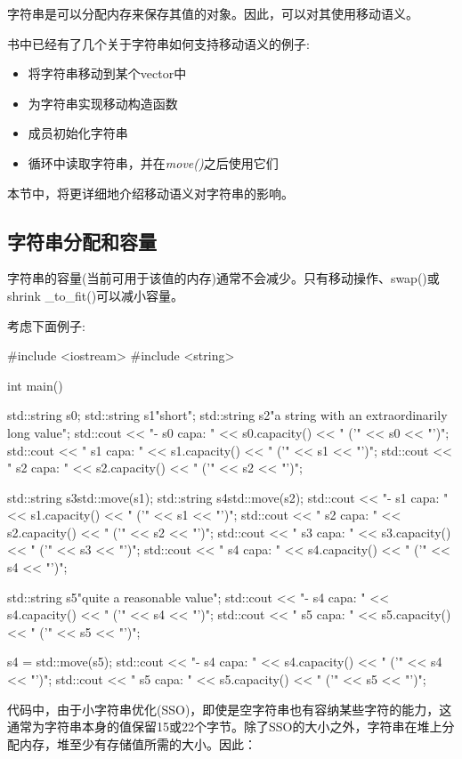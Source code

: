字符串是可以分配内存来保存其值的对象。因此，可以对其使用移动语义。

书中已经有了几个关于字符串如何支持移动语义的例子:

\begin{itemize}
	\item 将字符串移动到某个vector中
	\item 为字符串实现移动构造函数
	\item 成员初始化字符串
	\item 循环中读取字符串，并在\textit{move()}之后使用它们
\end{itemize}

本节中，将更详细地介绍移动语义对字符串的影响。

\subsection{字符串分配和容量}

字符串的容量(当前可用于该值的内存)通常不会减少。只有移动操作、swap()或shrink _to_fit()可以减小容量。

考虑下面例子:

\begin{cppcode}
#include <iostream>
#include <string>

int main()
{
	std::string s0;
	std::string s1{"short"};
	std::string s2{"a string with an extraordinarily long value"};
	std::cout << "- s0 capa: " << s0.capacity() << " ('" << s0 << "')\n";
	std::cout << " s1 capa: " << s1.capacity() << " ('" << s1 << "')\n";
	std::cout << " s2 capa: " << s2.capacity() << " ('" << s2 << "')\n";
	
	std::string s3{std::move(s1)};
	std::string s4{std::move(s2)};
	std::cout << "- s1 capa: " << s1.capacity() << " ('" << s1 << "')\n";
	std::cout << " s2 capa: " << s2.capacity() << " ('" << s2 << "')\n";
	std::cout << " s3 capa: " << s3.capacity() << " ('" << s3 << "')\n";
	std::cout << " s4 capa: " << s4.capacity() << " ('" << s4 << "')\n";
	
	std::string s5{"quite a reasonable value"};
	std::cout << "- s4 capa: " << s4.capacity() << " ('" << s4 << "')\n";
	std::cout << " s5 capa: " << s5.capacity() << " ('" << s5 << "')\n";
	
	s4 = std::move(s5);
	std::cout << "- s4 capa: " << s4.capacity() << " ('" << s4 << "')\n";
	std::cout << " s5 capa: " << s5.capacity() << " ('" << s5 << "')\n";
}
\end{cppcode}

代码中，由于小字符串优化(SSO)，即使是空字符串也有容纳某些字符的能力，这通常为字符串本身的值保留15或22个字节。除了SSO的大小之外，字符串在堆上分配内存，堆至少有存储值所需的大小。因此：

